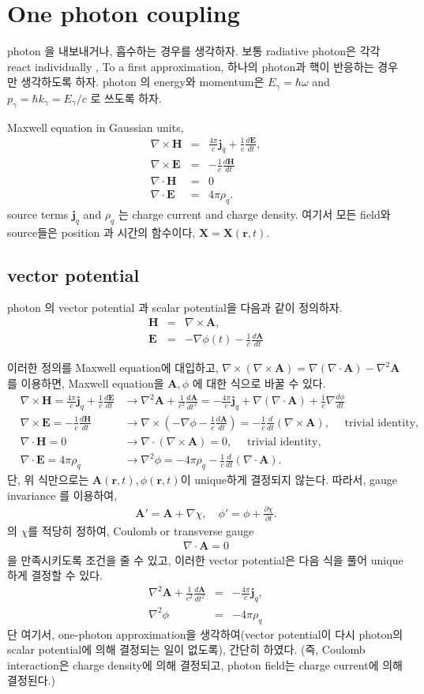 \documentclass[11pt]{book}
\def\bm{\boldsymbol}
\def\vr{{\bm r}}
\newcommand{\bea}{\begin{eqnarray}}
\newcommand{\eea}{\end{eqnarray}}
\newcommand{\no}{\nonumber \\}
\newcommand{\del}{\partial}
\begin{document}
\section{One photon coupling}
photon 을 내보내거나, 흡수하는 경우를 생각하자. 보통 radiative photon은 각각 react individually 
, To a first approximation, 하나의 photon과 핵이 반응하는 경우만 생각하도록 하자. 
photon 의 energy와 momentum은 $E_\gamma=\hbar\omega$ and $p_\gamma=\hbar k_\gamma=E_\gamma/c$
로 쓰도록 하자.

Maxwell equation in Gaussian units,
\bea 
\nabla\times {\bm H}&=&\frac{4\pi}{c}{\bm j}_q+\frac{1}{c}\frac{d {\bm E}}{dt},\no 
\nabla\times{\bm E}&=& -\frac{1}{c}\frac{d{\bm H}}{dt}\no 
\nabla\cdot{\bm H}&=& 0\no 
\nabla\cdot{\bm E}&=& 4\pi \rho_q. 
\eea 
source terms ${\bm j}_q$ and $\rho_q$ 는 charge current and charge density. 
여기서 모든 field와 source들은 position 과 시간의 함수이다, ${\bm X}={\bm X}({\bm r},t)$. 

\subsection{vector potential}
photon 의 vector potential 과 scalar potential을 다음과 같이 정의하자.
\bea 
{\bm H}&=&\nabla\times {\bm A}, \no
{\bm E}&=&-\nabla \phi(t) -\frac{1}{c}\frac{d{\bm A}}{dt}
\eea 

이러한 정의를 Maxwell equation에 대입하고, 
$\nabla\times(\nabla\times{\bm A})=\nabla(\nabla\cdot{\bm A})-\nabla^2{\bm A}$ 를 이용하면, 
Maxwell equation을 ${\bm A},\phi$ 에 대한 식으로 바꿀 수 있다.
\bea
& \nabla\times {\bm H}=\frac{4\pi}{c}{\bm j}_q+\frac{1}{c}\frac{d {\bm E}}{dt}
& \rightarrow 
  \nabla^2{\bm A}+\frac{1}{c^2}\frac{d{\bm A}}{dt^2}
  =-\frac{4\pi}{c}{\bm j}_q+\nabla(\nabla\cdot{\bm A})+\frac{1}{c}\nabla\frac{d\phi}{dt}\no 
& \nabla\times{\bm E}= -\frac{1}{c}\frac{d{\bm H}}{dt}
& \rightarrow  \nabla\times(-\nabla\phi-\frac{1}{c}\frac{d{\bm A}}{dt})
  =-\frac{1}{c}\frac{d}{dt}(\nabla\times{\bm A}),\quad \mbox{ trivial identity},\no 
& \nabla\cdot{\bm H}= 0
& \rightarrow  
  \nabla\cdot(\nabla\times {\bm A})=0,\quad \mbox{ trivial identity},\no 
& \nabla\cdot{\bm E}= 4\pi \rho_q 
& \rightarrow  \nabla^2 \phi =-4\pi \rho_q-\frac{1}{c}\frac{d}{dt}(\nabla\cdot {\bm A}). 
\eea 
단, 
위 식만으로는 ${\bm A}(\vr,t),\phi(\vr,t)$이 unique하게 결정되지 않는다. 
따라서, gauge invariance 를 이용하여,
\bea 
{\bm A}'={\bm A}+\nabla\chi, \quad \phi'=\phi+\frac{\del \chi}{\del t}.
\eea 
의 $\chi$를 적당히 정하여, Coulomb or transverse gauge
\bea
\nabla\cdot{\bm A}=0
\eea 
을 만족시키도록 조건을 줄 수 있고, 이러한 vector potential은 다음 식을 풀어 unique하게 결정할 수 있다. 
\bea 
\nabla^2{\bm A}+\frac{1}{c^2}\frac{d{\bm A}}{dt^2}
  &=& -\frac{4\pi}{c}{\bm j}_q,\no 
\nabla^2 \phi &=& -4\pi \rho_q
\eea 
단 여기서, one-photon approximation을 생각하여(vector potential이 다시 photon의 scalar potential에
의해 결정되는 일이 없도록), 간단히 하였다. (즉, Coulomb interaction은 charge density에 의해 결정되고,
photon field는 charge current에 의해 결정된다.) 
\end{document}
